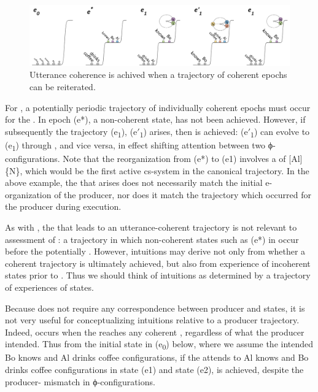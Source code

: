 \begin{figure}
\includegraphics[width=\textwidth]{figures/Tilsen-img125.png}
\caption{Utterance coherence is achived when a trajectory of coherent epochs can be reiterated.}
\label{fig:6:6}
\end{figure}
 
  For , a potentially periodic trajectory of individually coherent epochs must occur for the . In epoch (e*), a non-coherent state,  has not been achieved. However, if subsequently the trajectory (e\textsubscript{1}), (e$′$\textsubscript{1}) arises, then  is achieved: (e$′$\textsubscript{1}) can evolve to (e\textsubscript{1}) through , and vice versa, in effect shifting attention between two ϕ-configurations. Note that the reorganization from (e*) to (e1) involves a  of [Al]\{N\}, which would be the first active cs-system in the canonical trajectory. In the above example, the  that arises does not necessarily match the initial e-organization of the producer, nor does it match the trajectory which occurred for the producer during execution.

  As with , the  that leads to an utterance-coherent trajectory is not relevant to assessment of : a trajectory in which non-coherent states such as (e*) in {} occur before the potentially . However,  intuitions may derive not only from whether a coherent trajectory is ultimately achieved, but also from experience of incoherent states prior to . Thus we should think of  intuitions as determined by a trajectory of experiences of states.

  Because  does not require any correspondence between producer and  states, it is not very useful for conceptualizing  intuitions relative to a producer trajectory. Indeed,  occurs when the  reaches any coherent , regardless of what the producer intended. Thus from the initial state in (e\textsubscript{0}) below, where we assume the  intended {\textbar}Bo knows{\textbar} and {\textbar}Al drinks coffee{\textbar} configurations, if the  attends to {\textbar}Al knows{\textbar} and {\textbar}Bo drinks coffee{\textbar} configurations in state (e1) and state (e2),  is achieved, despite the producer- mismatch in ϕ-configurations.

